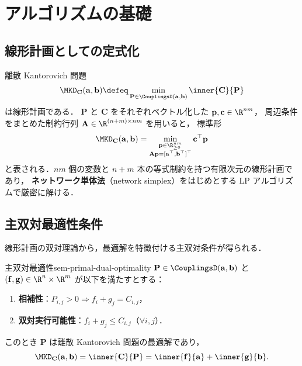 \chapter{アルゴリズムの基礎}
\label{ch:seminar-02}

\section{線形計画としての定式化}
\label{sec:sem-lp-standard}

離散 Kantorovich 問題
\[
  \MKD_{\mathbf{C}}(\mathbf{a}, \mathbf{b})
  \defeq \min_{\mathbf{P} \in \CouplingsD(\mathbf{a}, \mathbf{b})}
  \inner{\mathbf{C}}{\mathbf{P}}
\]
は線形計画である．
$\mathbf{P}$ と $\mathbf{C}$ をそれぞれベクトル化した
$\mathbf{p}, \mathbf{c} \in \R^{nm}$，
周辺条件をまとめた制約行列 $\mathbf{A} \in \R^{(n+m) \times nm}$ を用いると，
標準形
\[
  \MKD_{\mathbf{C}}(\mathbf{a}, \mathbf{b})
  = \min_{\substack{\mathbf{p} \in \R_{\geq 0}^{nm} \\
    \mathbf{A}\mathbf{p} = [\mathbf{a}^\top, \mathbf{b}^\top]^\top}}
  \mathbf{c}^\top \mathbf{p}
\]
と表される．$nm$ 個の変数と $n + m$ 本の等式制約を持つ有限次元の線形計画であり，
\textbf{ネットワーク単体法}（network simplex）をはじめとする
LP アルゴリズムで厳密に解ける．

\section{主双対最適性条件}
\label{sec:sem-primal-dual}

線形計画の双対理論から，最適解を特徴付ける主双対条件が得られる．

\begin{claim}{主双対最適性}{sem-primal-dual-optimality}
  $\mathbf{P} \in \CouplingsD(\mathbf{a}, \mathbf{b})$ と
  $(\mathbf{f}, \mathbf{g}) \in \R^n \times \R^m$ が以下を満たすとする：
  \begin{enumerate}
    \item[(i)] \textbf{相補性}：$P_{i,j} > 0 \Longrightarrow f_i + g_j = C_{i,j}$，
    \item[(ii)] \textbf{双対実行可能性}：$f_i + g_j \leq C_{i,j}$（$\forall i, j$）．
  \end{enumerate}
  このとき $\mathbf{P}$ は離散 Kantorovich 問題の最適解であり，
  \[
    \MKD_{\mathbf{C}}(\mathbf{a}, \mathbf{b})
    = \inner{\mathbf{C}}{\mathbf{P}}
    = \inner{\mathbf{f}}{\mathbf{a}} + \inner{\mathbf{g}}{\mathbf{b}}.
  \]
\end{claim}

